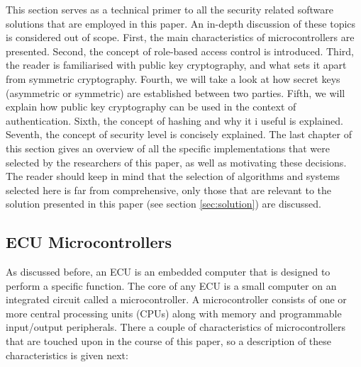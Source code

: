 \documentclass[master=cws,masteroption=vs,english]{kulemt}
\begin{document}
This section serves as a technical primer to all the security related software solutions that are employed in this paper. An in-depth discussion of these topics is considered out of scope. First, the main characteristics of microcontrollers are presented. Second, the concept of role-based access control is introduced. Third, the reader is familiarised with public key cryptography, and what sets it apart from symmetric cryptography. Fourth, we will take a look at how secret keys (asymmetric or symmetric) are established between two parties. Fifth, we will explain how public key cryptography can be used in the context of authentication. Sixth, the concept of hashing and why it i useful is explained. Seventh, the concept of security level is concisely explained. The last chapter of this section gives an overview of all the specific implementations that were selected by the researchers of this paper, as well as motivating these decisions. The reader should keep in mind that the selection of algorithms and systems selected here is far from comprehensive, only those that are relevant to the solution presented in this paper (see section \ref{sec:solution}) are discussed. 


\subsection{ECU Microcontrollers}
As discussed before, an ECU is an embedded computer that is designed to perform a specific function. The core of any ECU is a small computer on an integrated circuit called a microcontroller. A microcontroller consists of one or more central processing units (CPUs)  along with memory and programmable input/output peripherals. There a couple of characteristics of microcontrollers that are touched upon in the course of this paper, so a description of these characteristics is given next:
\end{document}
